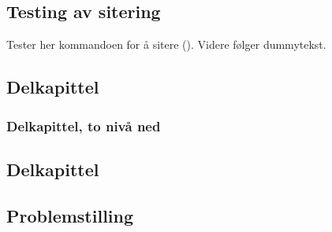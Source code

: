 
\subsection{Testing av sitering}
Tester her kommandoen for å sitere (\cite{latex}). Videre følger dummytekst.

\subsection{Delkapittel}
\blindtext
\subsubsection{Delkapittel, to nivå ned}

\blindmathpaper

\subsection{Delkapittel}
\blindtext

\subsection{Problemstilling}
\blindtext
